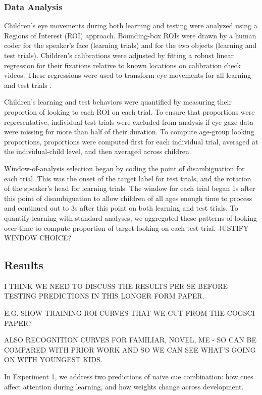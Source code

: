\documentclass[man,floatsintext]{apa6}
\begin{document}
\subsubsection{Data Analysis}

Children's eye movements during both learning and testing were analyzed using a Regions of Interest (ROI) approach. Bounding-box ROIs were drawn by a human coder for the speaker's face (learning trials) and for the two objects (learning and test trials). Children's calibrations were adjusted by fitting a robust linear regression for their fixations relative to known locations on calibration check videos. These regressions were used to transform eye movements for all learning and test trials \cite{Frank2012d}.

Children's learning and test behaviors were quantified by measuring their proportion of looking to each ROI on each trial. To ensure that proportions were representative, individual test trials were excluded from analysis if eye gaze data were missing for more than half of their duration. To compute age-group looking proportions, proportions were computed first for each individual trial, averaged at the individual-child level, and then averaged across children.

Window-of-analysis selection began by coding the point of disambiguation for each trial. This was the onset of the target label for test trials, and the rotation of the speaker's head for learning trials. The window for each trial began 1s after this point of disambiguation to allow children of all ages enough time to process and continued out to 3s after this point on both learning and test trials. To quantify learning with standard analyses, we aggregated these patterns of looking over time to compute proportion of target looking on each test trial. JUSTIFY WINDOW CHOICE?

\subsection{Results}

I THINK WE NEED TO DISCUSS THE RESULTS PER SE BEFORE TESTING PREDICTIONS IN THIS LONGER FORM PAPER.

E.G. SHOW TRAINING ROI CURVES THAT WE CUT FROM THE COGSCI PAPER?

ALSO RECOGNITION CURVES FOR FAMILIAR, NOVEL, ME - SO CAN BE COMPARED WITH PRIOR WORK AND SO WE CAN SEE WHAT'S GOING ON WITH YOUNGEST KIDS.

In Experiment 1, we address two predictions of na\"{i}ve cue combination: how cues affect attention during learning, and how weights change across development.
\end{document}
